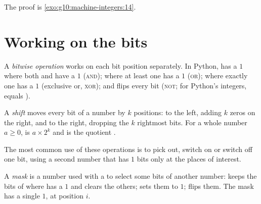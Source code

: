 The proof is \cref{exo:g10:machine-integers:14}.

\section{Working on the bits}\label{sec:g10:machine-integers:bitwise}

\begin{definition}\label{def:g10:machine-integers:bitwise}
A \emph{bitwise operation} works on each bit position separately. In Python,
 has a $1$ where both  and  have a $1$ (\textsc{and});  where at least one
has a $1$ (\textsc{or});  where exactly one has a $1$ (exclusive or, \textsc{xor}); and  flips
every bit (\textsc{not}; for Python's integers,  equals ).
\end{definition}

\begin{definition}[Shift]\label{def:g10:machine-integers:shift}
A \emph{shift} moves every bit of a number by $k$ positions:  to the left,
adding $k$ zeros on the right, and  to the right, dropping the $k$ rightmost bits. For a whole number
$a \ge 0$,  is $a \times 2^k$ and  is the quotient .
\end{definition}

The most common use of these operations is to pick out, switch on or switch off one bit, using a second number that
has $1$ bits only at the places of interest.

\begin{definition}[Mask]\label{def:g10:machine-integers:mask}
A \emph{mask} is a number used with a  to select some bits of another number:
 keeps the bits of  where  has a $1$ and clears the others;  sets them to
$1$;  flips them. The mask  has a single $1$, at position $i$.
\end{definition}

